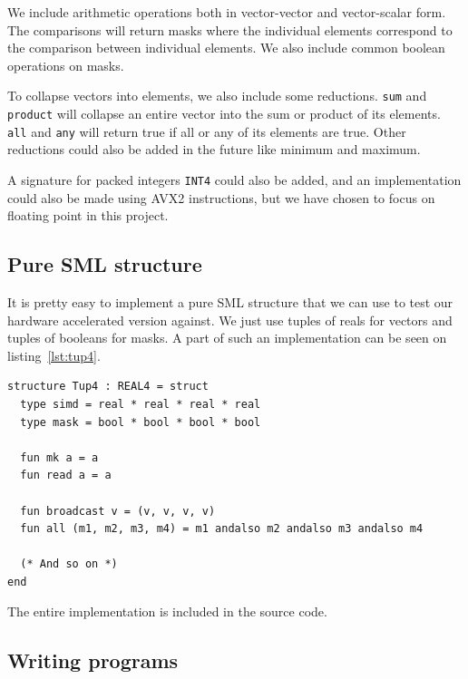 \documentclass{article}
\begin{document}
We include arithmetic operations both in vector-vector and vector-scalar form. The comparisons will return masks where the individual elements correspond to the comparison between individual elements. We also include common boolean operations on masks.

To collapse vectors into elements, we also include some reductions. \verb!sum! and \verb!product! will collapse an entire vector into the sum or product of its elements. \verb!all! and \verb!any! will return true if all or any of its elements are true. Other reductions could also be added in the future like minimum and maximum.

A signature for packed integers \texttt{INT4} could also be added, and an implementation could also be made using AVX2 instructions, but we have chosen to focus on floating point in this project.

\subsection{Pure SML structure}

It is pretty easy to implement a pure SML structure that we can use to test our hardware accelerated version against. We just use tuples of reals for vectors and tuples of booleans for masks. A part of such an implementation can be seen on listing~\ref{lst:tup4}.
\begin{lstlisting}[frame=single, label={lst:tup4}, caption={Implementation of \texttt{REAL4} using tuples}]
structure Tup4 : REAL4 = struct
  type simd = real * real * real * real
  type mask = bool * bool * bool * bool

  fun mk a = a
  fun read a = a

  fun broadcast v = (v, v, v, v)
  fun all (m1, m2, m3, m4) = m1 andalso m2 andalso m3 andalso m4

  (* And so on *)
end
\end{lstlisting}
The entire implementation is included in the source code.

\subsection{Writing programs}
\end{document}
